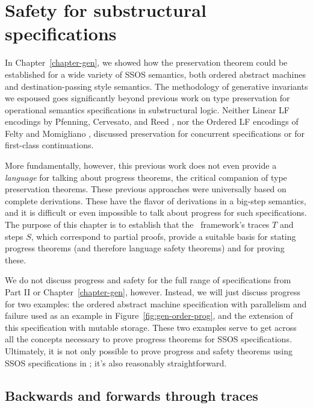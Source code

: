 \chapter{Safety for substructural specifications}
\label{chapter-safety}

In Chapter~\ref{chapter-gen}, we showed how the preservation theorem
could be established for a wide variety of SSOS semantics, both
ordered abstract machines and destination-passing style semantics.
The methodology of generative invariants we espoused goes
significantly beyond previous work on type preservation for
operational semantics specifications in substructural logic.  Neither
Linear LF encodings by Pfenning, Cervesato, and Reed
\cite{cervesato02linear,reed09hybrid}, nor the Ordered LF encodings of
Felty and Momigliano \cite{felty12hybrid}, discussed preservation for
concurrent specifications or for first-class continuations. 

More fundamentally, however, this previous work does not even provide
a {\it language} for talking about progress theorems, the critical
companion of type preservation theorems.  These previous approaches
were universally based on complete derivations. These have the flavor
of derivations in a big-step semantics, and it is difficult or even
impossible to talk about progress for such specifications. The purpose
of this chapter is to establish that the \sls~framework's traces $T$
and steps $S$, which correspond to partial proofs, provide a suitable
basis for stating progress theorems (and therefore language safety
theorems) and for proving these.

We do not discuss progress and safety for the full range of
specifications from Part II or Chapter~\ref{chapter-gen},
however. Instead, we will just discuss progress for two examples: the
ordered abstract machine specification with parallelism and failure
used as an example in Figure~\ref{fig:gen-order-prog}, and the
extension of this specification with mutable storage. These two
examples serve to get across all the concepts necessary to prove
progress theorems for SSOS specifications. Ultimately, it is not only
possible to prove progress and safety theorems using SSOS specifications
in \sls; it's also reasonably straightforward. 

\section{Backwards and forwards through traces}

